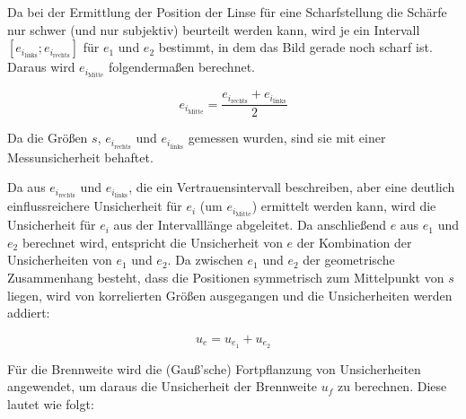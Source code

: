 \documentclass[a4paper,12pt]{article}
\begin{document}
Da bei der Ermittlung der Position der Linse für eine Scharfstellung die Schärfe nur schwer (und nur subjektiv)
beurteilt werden kann, wird je ein Intervall $[e_{i_\mathrm{links}};e_{i_\mathrm{rechts}}]$ für $e_1$ und
$e_2$ bestimmt, in dem das Bild gerade noch scharf ist. Daraus wird $e_{i_\mathrm{Mitte}}$ folgendermaßen berechnet.

\begin{equation}
    \label{eq:BesselAbstandIntervall}
    e_{i_\mathrm{Mitte}} = \frac{e_{i_\mathrm{rechts}} + e_{i_\mathrm{links}}}{2}
\end{equation}

Da die Größen $s$, $e_{i_\mathrm{rechts}}$ und $e_{i_\mathrm{links}}$ gemessen wurden, sind sie mit einer
Messunsicherheit behaftet. 


Da aus $e_{i_\mathrm{rechts}}$ und $e_{i_\mathrm{links}}$, die ein Vertrauensintervall beschreiben, aber eine
deutlich einflussreichere Unsicherheit für $e_i$ (um $e_{i_\mathrm{Mitte}}$) ermittelt werden kann, wird die Unsicherheit
für $e_i$ aus der Intervalllänge abgeleitet.
Da anschließend $e$ aus $e_1$ und $e_2$ berechnet wird, entspricht die Unsicherheit von $e$ der Kombination der
Unsicherheiten von $e_1$ und $e_2$.
Da zwischen $e_1$ und $e_2$ der geometrische Zusammenhang besteht, dass die Positionen symmetrisch zum Mittelpunkt
von $s$ liegen, wird von korrelierten Größen ausgegangen und die Unsicherheiten werden addiert:





\begin{equation}
    \label{eq:UnkorrUnsFortpfl}
    u_e=u_{e_1}+u_{e_2}
\end{equation}

Für die Brennweite wird die (Gauß'sche) Fortpflanzung von Unsicherheiten angewendet,
um daraus die Unsicherheit der Brennweite $u_f$ zu berechnen. Diese lautet wie folgt:
\end{document}
